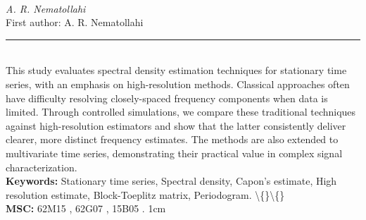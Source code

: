 \documentclass[10pt,twoside]{article}
\begin{document}
\noindent\begin{minipage}[t][\textheight]{\textwidth}
\\[0.35em]
{\itshape A. R. Nematollahi}\\[0.2em]
{\footnotesize First author: A. R. Nematollahi}\\[0.45em]
\noindent\rule{\textwidth}{0.3pt}\\[0.4em]
{\footnotesize  This study evaluates spectral density estimation techniques for stationary time series, with an emphasis on high-resolution methods. Classical approaches often have difficulty resolving closely-spaced frequency components when data is limited. Through controlled simulations, we compare these traditional techniques against high-resolution estimators and show that the latter consistently deliver clearer, more distinct frequency estimates. The methods are also extended to multivariate time series, demonstrating their practical value in complex signal characterization.}\\[0.4em]
{\footnotesize\bfseries Keywords:} {\footnotesize Stationary time series, Spectral density, Capon's estimate, High resolution estimate, Block-Toeplitz matrix, Periodogram. \textbackslash\{\}\textbackslash\{\}}\\[0.15em]
{\footnotesize\bfseries MSC:} {\footnotesize 62M15 , 62G07 , 15B05 . 1cm}\\
\vfill
\end{minipage}
\newpage
\end{document}
